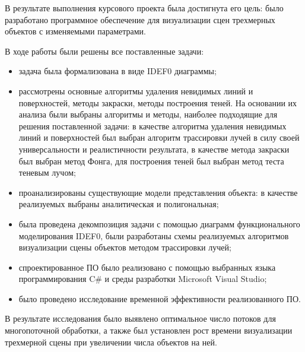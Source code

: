 
В результате выполнения курсового проекта была достигнута его цель: было разработано программное обеспечение для визуализации сцен трехмерных объектов с изменяемыми параметрами. 

В ходе работы были решены все поставленные задачи:
\begin{itemize}
	\item задача была формализована в виде IDEF0 диаграммы;
	\item рассмотрены основные алгоритмы удаления невидимых линий и поверхностей, методы закраски, методы построения теней. На основании их анализа были выбраны алгоритмы и методы, наиболее подходящие для решения поставленной задачи: в качестве алгоритма удаления невидимых линий и поверхностей был выбран алгоритм трассировки лучей в силу своей универсальности и реалистичности результата, в качестве метода закраски был выбран метод Фонга, для построения теней был выбран метод теста теневым лучом;
	\item проанализированы существующие модели представления объекта: в качестве реализуемых выбраны аналитическая и полигональная;
	\item была проведена декомпозиция задачи с помощью диаграмм функционального моделирования IDEF0, были разработаны схемы реализуемых алгоритмов визуализации сцены объектов методом трассировки лучей;
	\item спроектированное ПО было реализовано с помощью выбранных языка программирования C\# и среды разработки Microsoft Visual Studio;
	\item было проведено исследование временной эффективности реализованного ПО.
\end{itemize}

В результате исследования было выявлено оптимальное число потоков для многопоточной обработки, а также был установлен рост времени визуализации трехмерной сцены при увеличении числа объектов на ней.